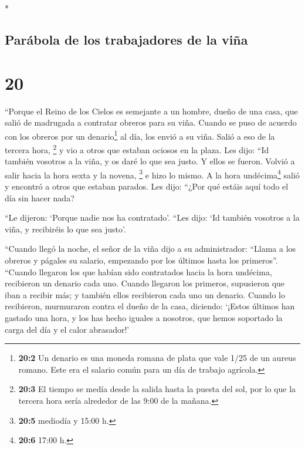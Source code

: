 \begin{paracol}{2}
\begin{otherlanguage}{english}
\end{otherlanguage}

\switchcolumn[0]*

\hypertarget{paruxe1bola-de-los-trabajadores-de-la-viuxf1a}{%
\subsection{Parábola de los trabajadores de la
viña}\label{paruxe1bola-de-los-trabajadores-de-la-viuxf1a}}

\hypertarget{section-38}{%
\section{20}\label{section-38}}

 ``Porque el Reino de los Cielos es semejante a un hombre,
dueño de una casa, que salió de madrugada a contratar obreros para su
viña.  Cuando se puso de acuerdo con los obreros por un
denario\footnote{\textbf{20:2} Un denario es una moneda romana de plata
  que vale 1/25 de un aureus romano. Este era el salario común para un
  día de trabajo agrícola.} al día, los envió a su viña. 
Salió a eso de la tercera hora, \footnote{\textbf{20:3} El tiempo se
  medía desde la salida hasta la puesta del sol, por lo que la tercera
  hora sería alrededor de las 9:00 de la mañana.} y vio a otros que
estaban ociosos en la plaza.  Les dijo: ``Id también
vosotros a la viña, y os daré lo que sea justo. Y ellos se fueron.
 Volvió a salir hacia la hora sexta y la novena,
\footnote{\textbf{20:5} mediodía y 15:00 h.} e hizo lo mismo.
 A la hora undécima\footnote{\textbf{20:6} 17:00 h.} salió
y encontró a otros que estaban parados. Les dijo: ``¿Por qué estáis aquí
todo el día sin hacer nada?

 ``Le dijeron: `Porque nadie nos ha contratado'. ``Les
dijo: `Id también vosotros a la viña, y recibiréis lo que sea justo'.

 ``Cuando llegó la noche, el señor de la viña dijo a su
administrador: ``Llama a los obreros y págales su salario, empezando por
los últimos hasta los primeros''.  ``Cuando llegaron los
que habían sido contratados hacia la hora undécima, recibieron un
denario cada uno.  Cuando llegaron los primeros,
supusieron que iban a recibir más; y también ellos recibieron cada uno
un denario.  Cuando lo recibieron, murmuraron contra el
dueño de la casa,  diciendo: `¡Estos últimos han gastado
una hora, y los has hecho iguales a nosotros, que hemos soportado la
carga del día y el calor abrasador!'


\end{paracol}
